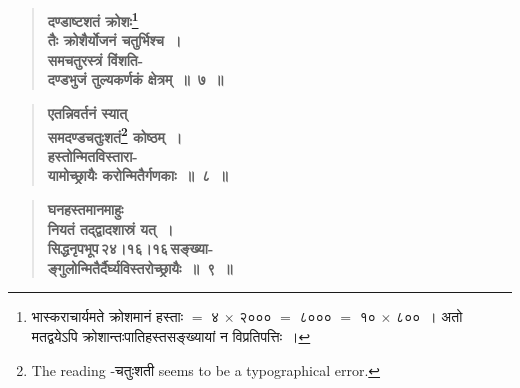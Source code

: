 \documentclass[11pt, openany]{book}
\begin{document}
 \label{1.7}
\begin{quote}
{\large \textbf{{\color{purple}दण्डाष्टशतं क्रोशः\renewcommand{\thefootnote}{३}\footnote{भास्कराचार्यमते क्रोशमानं हस्ताः $=$ ४ $\times$ २००० $=$ ८००० $=$ १० $\times$ ८००~। अतो मतद्वयेऽपि क्रोशान्तःपातिहस्तसङ्ख्यायां न विप्रतिपत्तिः~।}\\
तैः क्रोशैर्योजनं चतुर्भिश्च~।\\
समचतुरस्त्रं विंशति-\\
दण्डभुजं तुल्यकर्णकं क्षेत्रम्~॥~७~॥}}}
\end{quote}
\vspace{-8mm}

 \label{1.8}
\begin{quote}
{\large \textbf{{\color{purple}एतन्निवर्तनं स्यात् \\
समदण्डचतुःशतं\renewcommand{\thefootnote}{४}\footnote{The reading -चतुःशती seems to be a typographical error.} कोष्ठम्~।\\
हस्तोन्मितविस्तारा-\\
यामोच्छ्रायैः करोन्मितैर्गणकाः~॥~८~॥}}}
\end{quote}
\vspace{-8mm}

 \label{1.9}
\begin{quote}
{\large \textbf{{\color{purple}घनहस्तमानमाहुः \\
नियतं तद्द्वादशास्रं यत्~। \\
सिद्धनृपभूप\textendash \,२४।१६।१६\textendash \,सङ्ख्या-\\
ङ्गुलोन्मितैर्दैर्घ्यविस्तरोच्छ्रायैः~॥~९~॥}}}
\end{quote}

\newpage
	
\end{document}
